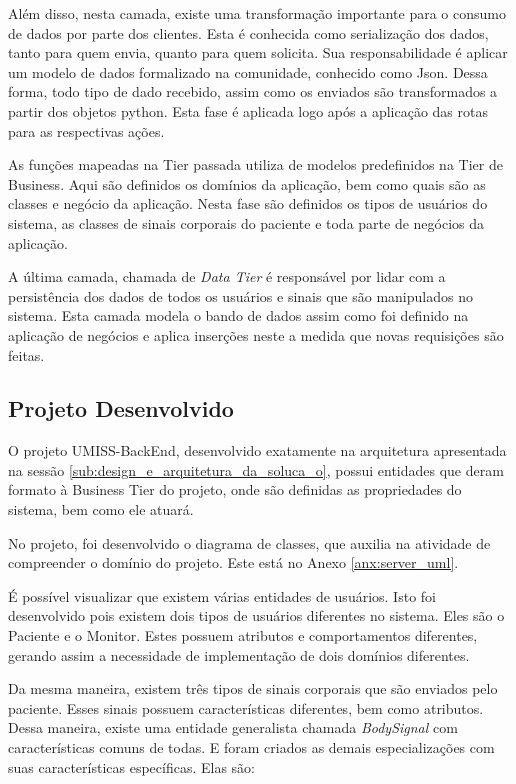Além disso, nesta camada, existe uma transformação importante para o consumo de dados por parte dos clientes.
Esta é conhecida como serialização dos dados, tanto para quem envia, quanto para quem solicita.
Sua responsabilidade é aplicar um modelo de dados formalizado na comunidade, conhecido como Json.
Dessa forma, todo tipo de dado recebido, assim como os enviados são transformados  a partir
dos objetos python. Esta fase é aplicada logo após a aplicação das rotas para as respectivas
ações.

As funções mapeadas na Tier passada utiliza de modelos predefinidos na Tier de Business.
Aqui são definidos os domínios da aplicação, bem como quais são as classes e negócio da
aplicação. Nesta fase são definidos os tipos de usuários do sistema, as classes de sinais
corporais do paciente e toda parte  de negócios da aplicação.

A última camada, chamada de \textit{Data Tier} é responsável por lidar com a persistência dos dados
de todos os usuários e sinais que são manipulados no sistema. Esta camada modela o
bando de dados assim como foi definido na aplicação de negócios e aplica
inserções neste a medida que novas requisições são feitas.

\subsection{Projeto Desenvolvido}
\label{sub:projetodesenvolvido}

O projeto UMISS-BackEnd, desenvolvido exatamente na arquitetura apresentada na sessão
\ref{sub:design_e_arquitetura_da_soluca_o}, possui entidades que deram formato à Business
Tier do projeto, onde são definidas as propriedades do sistema, bem como ele atuará.

No projeto, foi desenvolvido o diagrama de classes, que auxilia na atividade de compreender
o domínio do projeto. Este está no Anexo \ref{anx:server_uml}.

É possível visualizar que existem várias entidades de usuários. Isto foi desenvolvido pois
existem dois tipos de usuários diferentes no sistema. Eles são o Paciente e o Monitor. Estes
possuem atributos e comportamentos diferentes, gerando assim a necessidade de implementação
de dois domínios diferentes.

Da mesma maneira, existem três tipos de sinais corporais que são enviados pelo paciente.
Esses sinais possuem características diferentes, bem como atributos. Dessa maneira, existe
uma entidade generalista chamada \textit{BodySignal} com características comuns de todas. E
foram criados as demais especializações com suas características  específicas. Elas são:

